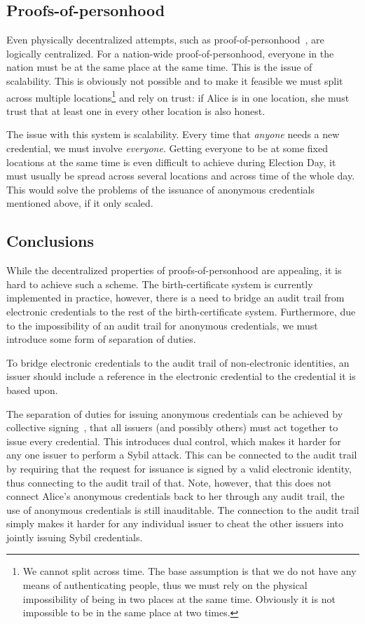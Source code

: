 \subsection{Proofs-of-personhood}

Even physically decentralized attempts, such as 
proof-of-personhood~\cite{proof-of-personhood}, are logically centralized.
For a nation-wide proof-of-personhood, everyone in the nation must be at the 
same place at the same time.
This is the issue of scalability.
This is obviously not possible and to make it feasible we must split across 
multiple locations\footnote{%
  We cannot split across time.
  The base assumption is that we do not have any means of authenticating 
  people, thus we must rely on the physical impossibility of being in two 
  places at the same time.
  Obviously it is not impossible to be in the same place at two times.
} and rely on trust: if Alice is in one location, she must trust that at least 
one in every other location is also honest.

The issue with this system is scalability.
Every time that \emph{anyone} needs a new credential, we must involve 
\emph{everyone}.
Getting everyone to be at some fixed locations at the same time is even 
difficult to achieve during Election Day, it must usually be spread across 
several locations and across time of the whole day.
This would solve the problems of the issuance of anonymous credentials 
mentioned above, if it only scaled.


\subsection{Conclusions}


While the decentralized properties of proofs-of-personhood are appealing, it is 
hard to achieve such a scheme.
The birth-certificate system is currently implemented in practice, however, 
there is a need to bridge an audit trail from electronic credentials to the 
rest of the birth-certificate system.
Furthermore, due to the impossibility of an audit trail for anonymous 
credentials, we must introduce some form of separation of duties.

To bridge electronic credentials to the audit trail of non-electronic 
identities, an issuer should include a reference in the electronic credential 
to the credential it is based upon.

The separation of duties for issuing anonymous credentials can be achieved by 
collective signing~\cite{collective-signing}, \ie that all issuers (and 
possibly others) must act together to issue every credential.
This introduces dual control, which makes it harder for any one issuer to 
perform a Sybil attack.
This can be connected to the audit trail by requiring that the request for 
issuance is signed by a valid electronic identity, thus connecting to the audit 
trail of that.
Note, however, that this does not connect Alice's anonymous credentials back to 
her through any audit trail, the use of anonymous credentials is still 
inauditable.
The connection to the audit trail simply makes it harder for any individual 
issuer to cheat the other issuers into jointly issuing Sybil credentials.

